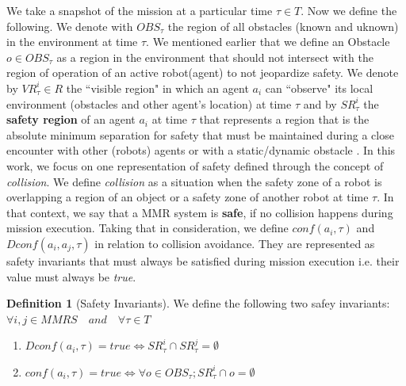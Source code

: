 \documentclass[journal]{IEEEtran}
\theoremstyle{definition}
\newtheorem{definition}{Definition}
\begin{document}
We take a snapshot of the mission at a particular time $\tau \in T$. Now we define the following.
We denote with $OBS_\tau$ the region of all obstacles (known and uknown) in the environment at time $\tau$. We mentioned earlier that we define an Obstacle $o \in OBS_\tau$ as a region in the environment that should not intersect with the region of operation of an active robot(agent) to not jeopardize safety. 
We denote by $VR_\tau^i \in R $ the ``visible region" in which an agent $a_i$ can ``observe" its local environment (obstacles and other agent's location) at time $\tau$ and by $SR_\tau^i$ the \textbf{safety region} of an agent $a_i$  at time $\tau$ that represents a region that is the  absolute  minimum  separation  for  safety that must  be  maintained  during  a close  encounter  with  other (robots) agents  or with  a static/dynamic obstacle . 
In this work, we focus on one representation of safety defined through the concept of \textit{collision}. We define \textit{collision} as a situation when the safety zone of a robot is overlapping a region of an object or a safety zone of another robot at time $\tau$. In that context, we say that a MMR system is \textbf{safe}, if no collision happens during mission execution. Taking that in consideration, we define $conf(a_i, \tau)$ and $Dconf(a_i, a_j,\tau)$ in relation to collision avoidance. They are represented as safety invariants that must always be satisfied during mission execution  i.e. their value must always be \textit{true}.








\begin{definition}[Safety Invariants]
We define the following two safey invariants: $ \forall i,j \in MMRS  \quad and \quad \forall \tau \in T$ 
\begin{enumerate}
\item $ Dconf(a_i, \tau)=true \iff SR_\tau^i \cap SR_\tau^j  = \emptyset        $  
\item $  conf(a_i, \tau)=true  \iff  \forall o \in OBS_\tau;
SR_\tau^i \cap o = \emptyset $ \\
\end{enumerate}
\end{definition}
\end{document}

